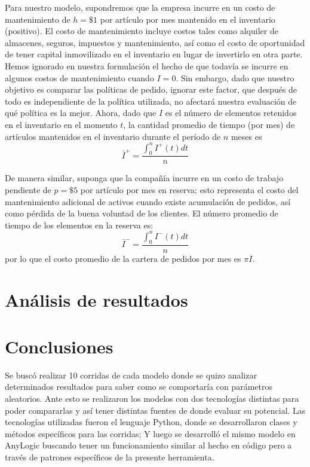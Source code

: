Para nuestro modelo, supondremos que la empresa incurre en un costo de mantenimiento de
$h = \$1$ por artículo por mes mantenido en el inventario (positivo).
El costo de mantenimiento incluye costos tales como alquiler de almacenes, seguros, impuestos
y mantenimiento, así como el costo de oportunidad de tener capital inmovilizado en el inventario
en lugar de invertirlo en otra parte.
Hemos ignorado en nuestra formulación el hecho de que todavía se incurre en algunos costos de
mantenimiento cuando $I = 0$.
Sin embargo, dado que nuestro objetivo es comparar las políticas de pedido, ignorar este factor,
que después de todo es independiente de la política utilizada, no afectará nuestra evaluación
de qué política es la mejor.
Ahora, dado que $I$ es el número de elementos retenidos en el inventario en el momento $t$,
la cantidad promedio de tiempo (por mes) de artículos mantenidos en el inventario durante el
período de $n$ meses es
\begin{equation}
  \label{eq:equation11}
  \bar{I}^{+}=\frac{\int_{0}^{n}I^{+}(t)dt}{n}
\end{equation}

De manera similar, suponga que la compañía incurre en un costo de trabajo pendiente de $p = \$5$ por
artículo por mes en reserva;
esto representa el costo del mantenimiento adicional de activos cuando existe acumulación de pedidos,
así como pérdida de la buena voluntad de los clientes.
El número promedio de tiempo de los elementos en la reserva es:
\begin{equation}
    \label{eq:equation12}
    \bar{I}^{-}=\frac{\int_{0}^{n}I^{-}(t)dt}{n}
\end{equation}
por lo que el costo promedio de la cartera de pedidos por mes es $\pi I$.


\section{Análisis de resultados}
    
    
    
    


\section{Conclusiones}
\label{sec:conclusiones}
Se buscó realizar 10 corridas de cada modelo donde se quizo analizar determinados resultados para saber como se comportaría con parámetros aleatorios.
Ante esto se realizaron los modelos con dos tecnologías distintas para poder compararlas y así tener distintas fuentes de donde evaluar su potencial.
Las tecnologías utilizadas fueron el lenguaje Python, donde se desarrollaron clases y métodos específicos para las corridas;
Y luego se desarrolló el mismo modelo en AnyLogic buscando tener un funcionamiento similar al hecho en código pero a través de patrones específicos de la presente herramienta.

